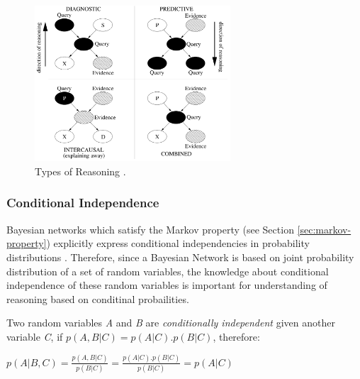 \documentclass[11pt]{article}
\begin{document}
\begin{figure}[tbh]
  \center
  \includegraphics[width=0.65\textwidth]{figure/reasoning-types.png}
  \caption{Types of Reasoning \cite{korb:bayesian-ai}.}
  \label{fig:reasoning-types}
\end{figure}

\subsubsection{Conditional Independence}
\label{sec:conditional-independence}

Bayesian networks which satisfy the Markov property (see Section
\ref{sec:markov-property}) explicitly express conditional independencies in
probability distributions \cite{korb:bayesian-ai}. Therefore, since a Bayesian
Network is based on joint probability distribution of a set of random variables,
the knowledge about conditional independence of these random variables is
important for understanding of reasoning based on conditinal probailities. 

Two random variables \textit{A} and \textit{B} are \textit{conditionally
independent} given another variable \textit{C}, if $p(A,B|C) = p(A|C).p(B|C)$,
therefore:

\begin{center}
$p(A|B,C) = \frac{p(A,B|C)}{p(B|C)} = \frac{p(A|C).p(B|C)}{p(B|C)} = p(A|C)$
\end{center}
\end{document}

